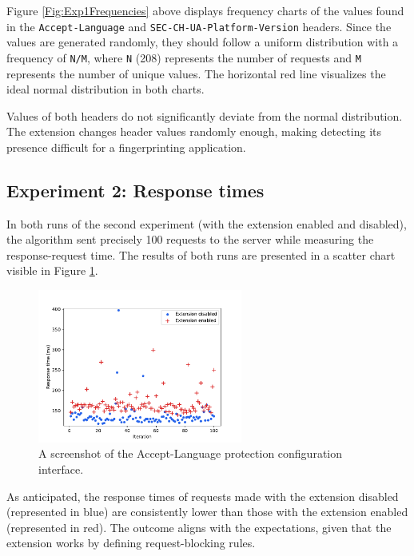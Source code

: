 \medbreak

Figure \ref{Fig:Exp1Frequencies} above displays frequency charts of the values found in the \texttt{Accept-Language} and \texttt{SEC-CH-UA-Platform-Version} headers. Since the values are generated randomly, they should follow a uniform distribution with a frequency of \verb|N/M|, where \verb|N| (208) represents the number of requests and \verb|M| represents the number of unique values. The horizontal red line visualizes the ideal normal distribution in both charts.

Values of both headers do not significantly deviate from the normal distribution. The extension changes header values randomly enough, making detecting its presence difficult for a fingerprinting application.

\subsection{Experiment 2: Response times}

In both runs of the second experiment (with the extension enabled and disabled), the algorithm sent precisely 100 requests to the server while measuring the response-request time. The results of both runs are presented in a scatter chart visible in Figure \ref{Fig:Exp2Chart}.

\begin{figure}[H]
    \centering
    \includegraphics[width=0.6\textwidth]{obrazky-figures/response_times_comparison}
    \caption{A screenshot of the Accept-Language protection configuration interface.}
    \label{Fig:Exp2Chart}
\end{figure}

As anticipated, the response times of requests made with the extension disabled (represented in blue) are consistently lower than those with the extension enabled (represented in red). The outcome aligns with the expectations, given that the extension works by defining request-blocking rules.

